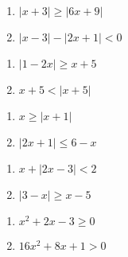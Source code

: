 \begin{multicols}{2}
\begin{enumerate}
\setcounter{enumi}{\value{HW}}

\item $|x + 3| \geq |6x + 9|$
\item  $|x-3| - |2x+1| < 0$ 

\setcounter{HW}{\value{enumi}}
\end{enumerate}
\end{multicols}

\begin{multicols}{2}
\begin{enumerate}
\setcounter{enumi}{\value{HW}}

\item $|1-2x| \geq x + 5$
\item  $x + 5 <  |x+5|$ 

\setcounter{HW}{\value{enumi}}
\end{enumerate}
\end{multicols}

\begin{multicols}{2}
\begin{enumerate}
\setcounter{enumi}{\value{HW}}

\item  $x \geq |x+1|$ 
\item   $|2x + 1| \leq 6-x$   

\setcounter{HW}{\value{enumi}}
\end{enumerate}
\end{multicols}

\begin{multicols}{2}
\begin{enumerate}
\setcounter{enumi}{\value{HW}}

\item  $x + |2x-3| < 2$  
\item  $|3-x| \geq x-5$  

\setcounter{HW}{\value{enumi}}
\end{enumerate}
\end{multicols}

\begin{multicols}{2}
\begin{enumerate}
\setcounter{enumi}{\value{HW}}

\item $x^{2} + 2x - 3 \geq 0$
\item  $16x^2+8x+1 > 0$

\setcounter{HW}{\value{enumi}}
\end{enumerate}
\end{multicols}

